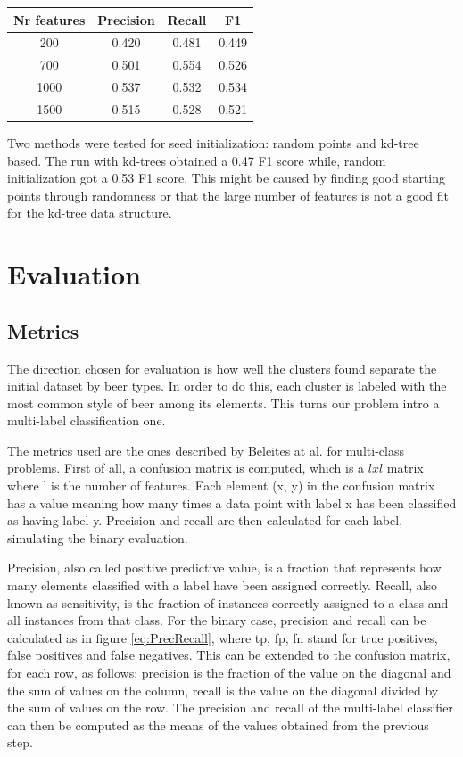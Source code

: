 \documentclass[12pt]{article}
\begin{document}
	\begin{center}
		\label{tab:features}
		\begin{tabular}{ |c|c|c|c| } 
			\hline
			Nr features & Precision & Recall & F1 \\
			\hline
			200 & 0.420 & 0.481 & 0.449 \\
			700 & 0.501 & 0.554 & 0.526 \\
			1000 & 0.537 & 0.532 & 0.534 \\
			1500 & 0.515 & 0.528 & 0.521 \\
			\hline
		\end{tabular}
	\end{center}

	Two methods were tested for seed initialization: random points and kd-tree based. The run with kd-trees obtained a 0.47 F1 score while, random initialization got a 0.53 F1 score. This might be caused by finding good starting points through randomness or that the large number of features is not a good fit for the kd-tree data structure.

	\section{Evaluation}
	\subsection{Metrics}
	The direction chosen for evaluation is how well the clusters found separate the initial dataset by beer types. In order to do this, each cluster is labeled with the most common style of beer among its elements. This turns our problem intro a multi-label classification one.
	
	The metrics used are the ones described by Beleites at al.\cite{MultilabelClassification} for multi-class problems. First of all, a confusion matrix is computed, which is a \(lxl\) matrix where l is the number of features. Each element (x, y) in the confusion matrix has a value meaning how many times a data point with label x has been classified as having label y. Precision and recall are then calculated for each label, simulating the binary evaluation. 
	
	Precision, also called positive predictive value, is a fraction that represents how many elements classified with a label have been assigned correctly. Recall, also known as sensitivity, is the fraction of instances correctly assigned to a class and all instances from that class. For the binary case, precision and recall can be calculated as in figure \ref{eq:PrecRecall}, where tp, fp, fn stand for true positives, false positives and false negatives. This can be extended to the confusion matrix, for each row, as follows: precision is the fraction of the value on the diagonal and the sum of values on the column, recall is the value on the diagonal divided by the sum of values on the row. The precision and recall of the multi-label classifier can then be computed as the means of the values obtained from the previous step.
	
\end{document}
